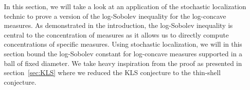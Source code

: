 In this section, we will take a look at an application of the stochastic localization technic 
to prove a version of the log-Sobolev inequality for the log-concave measures. As demonstrated in the 
introduction, the log-Sobolev inequality is central to the concentration of 
measures as it allows us to directly compute concentrations of specific measures. Using stochastic localization, 
we will in this section bound the log-Sobolev constant for log-concave measures 
supported in a ball of fixed diameter. We take heavy inspiration from the proof as presented in section~\ref{sec:KLS}
where we reduced the KLS conjecture to the thin-shell conjecture.




